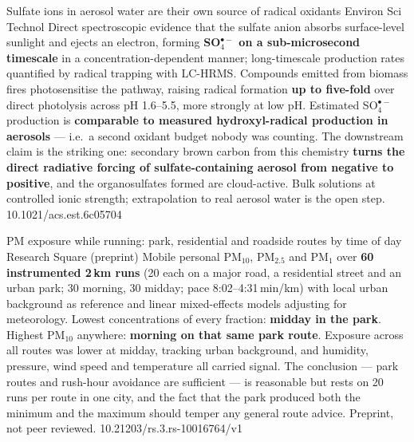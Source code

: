\documentclass[10pt]{article}
\begin{document}

{Sulfate ions in aerosol water are their own source of radical oxidants}
{Environ Sci Technol}
{Direct spectroscopic evidence that the sulfate anion absorbs surface-level sunlight and
ejects an electron, forming \textbf{SO$_4^{\bullet-}$ on a sub-microsecond timescale} in a
concentration-dependent manner; long-timescale production rates quantified by radical
trapping with LC-HRMS. Compounds emitted from biomass fires photosensitise the pathway,
raising radical formation \textbf{up to five-fold} over direct photolysis across
pH 1.6--5.5, more strongly at low pH. Estimated SO$_4^{\bullet-}$ production is
\textbf{comparable to measured hydroxyl-radical production in aerosols} --- i.e.\ a second
oxidant budget nobody was counting. The downstream claim is the striking one: secondary
brown carbon from this chemistry \textbf{turns the direct radiative forcing of
sulfate-containing aerosol from negative to positive}, and the organosulfates formed are
cloud-active. Bulk solutions at controlled ionic strength; extrapolation to real
aerosol water is the open step.}
{10.1021/acs.est.6c05704}

{PM exposure while running: park, residential and roadside routes by time of day}
{Research Square (preprint)}
{Mobile personal PM$_{10}$, PM$_{2.5}$ and PM$_1$ over \textbf{60 instrumented 2\,km runs}
(20 each on a major road, a residential street and an urban park; 30 morning, 30 midday;
pace 8:02--4:31\,min/km) with local urban background as reference and linear mixed-effects
models adjusting for meteorology. Lowest concentrations of every fraction:
\textbf{midday in the park}. Highest PM$_{10}$ anywhere: \textbf{morning on that same park
route}. Exposure across all routes was lower at midday, tracking urban background, and
humidity, pressure, wind speed and temperature all carried signal. The conclusion --- park
routes and rush-hour avoidance are sufficient --- is reasonable but rests on 20 runs per
route in one city, and the fact that the park produced both the minimum and the maximum
should temper any general route advice. Preprint, not peer reviewed.}
{10.21203/rs.3.rs-10016764/v1}
\end{document}
